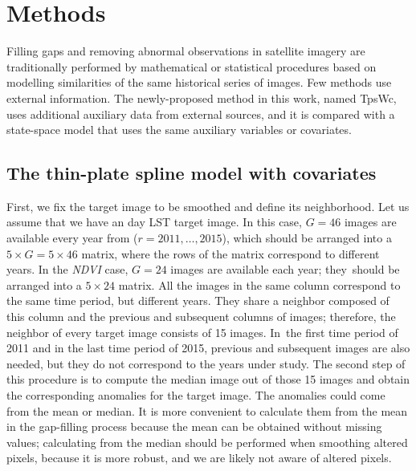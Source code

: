 \section{Methods}
\label{Chap6_sec:methods}

Filling gaps and removing abnormal observations in satellite imagery are traditionally performed by mathematical or statistical procedures based on modelling similarities of the same historical series of images. Few methods use external information. The newly-proposed method in this work, named TpsWc, uses additional auxiliary data from external sources, and it is compared with a state-space model that uses the same auxiliary variables or covariates.

\subsection{The thin-plate spline model with covariates}

First, we fix the target image to be smoothed and define its neighborhood. Let us assume that we have an day LST target image.
In this case, $G=46$ images are available every year from ($r=2011,\ldots,2015$), %
which should be arranged into a $5 \times G=5 \times 46$ matrix, where the rows of the matrix correspond to different years. In the \emph{NDVI} case, $G=24$ images are available each year; they~should be arranged into a $5 \times 24$ matrix.
 All the images in the same column correspond to the same time period, but different years. They share a neighbor composed of this column and the previous and subsequent columns of images; therefore, the neighbor of every target image consists of 15 images. In~the first time period of 2011 and in the last time period of 2015,
previous and subsequent images are also needed, but they do not correspond to the years under study.
The second step of this procedure is to compute the median image out of those 15 images and obtain the corresponding anomalies for the target image.
The anomalies could come from the mean or median. It is more convenient to calculate them from the mean in the gap-filling process because the mean can be obtained without missing values; calculating from the median should be performed
when smoothing altered pixels, because it is more robust, and we are likely not aware of altered pixels.

